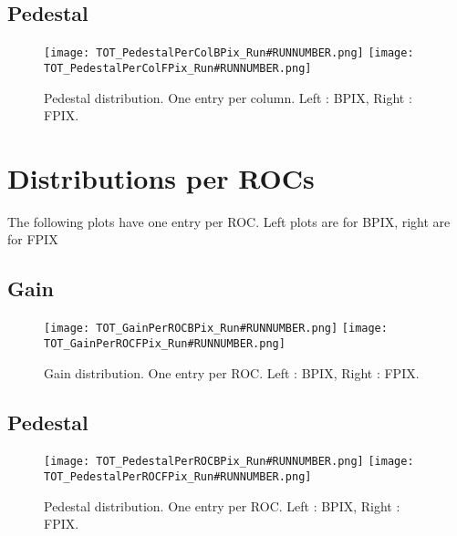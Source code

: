 \documentclass[a4paper,10pt]{article}
\begin{document}
\subsection{Pedestal}

\begin{figure}[htp]
 \centering
\subfigure
 {\texttt{[image: TOT\_PedestalPerColBPix\_Run\#RUNNUMBER.png]}}
\subfigure
 {\texttt{[image: TOT\_PedestalPerColFPix\_Run\#RUNNUMBER.png]}}
\caption{Pedestal distribution. One entry per column. Left : BPIX, Right : FPIX.}
\end{figure}
\clearpage


\pagebreak






\section{Distributions per ROCs\label{sec:ROC}}

The following plots have one entry per ROC. Left plots are for BPIX, right are for FPIX

\subsection{Gain}

\begin{figure}[htp]
 \centering
\subfigure
 {\texttt{[image: TOT\_GainPerROCBPix\_Run\#RUNNUMBER.png]}}
\subfigure
 {\texttt{[image: TOT\_GainPerROCFPix\_Run\#RUNNUMBER.png]}}
\caption{Gain distribution. One entry per ROC. Left : BPIX, Right : FPIX.}
\end{figure}



\subsection{Pedestal}

\begin{figure}[htp]
 \centering
\subfigure
 {\texttt{[image: TOT\_PedestalPerROCBPix\_Run\#RUNNUMBER.png]}}
\subfigure
 {\texttt{[image: TOT\_PedestalPerROCFPix\_Run\#RUNNUMBER.png]}}
\caption{Pedestal distribution. One entry per ROC. Left : BPIX, Right : FPIX.}
\end{figure}
\clearpage


\pagebreak
\end{document}

